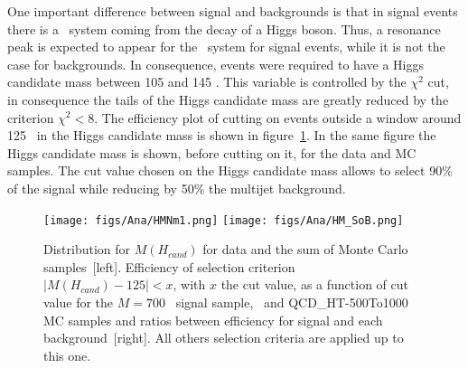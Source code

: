 %
%
One important difference between signal and backgrounds is that in signal events there is a \bbbar~system coming from the decay of a Higgs boson. Thus, a resonance peak is expected to appear for the \bbbar~system for signal events, while it is not the case for backgrounds. In consequence, events were required to have a Higgs candidate mass between 105 and 145 \GeVcc. This variable is controlled by the $\chi^{2}$ cut, in consequence the tails of the Higgs candidate mass are greatly reduced by the criterion $\chi^{2}<8$. The efficiency plot of cutting on events outside a window around 125 \GeVcc~in the Higgs candidate mass is shown in figure~\ref{fig:HiggsMassDMC}. In the same figure the Higgs candidate mass is shown, before cutting on it, for the data and MC samples. The cut value chosen on the Higgs candidate mass allows to select 90\% of the signal while reducing by 50\% the multijet background. 

\begin{figure}[!Hhtbp]
  \begin{center}
    \texttt{[image: figs/Ana/HMNm1.png]}
    \texttt{[image: figs/Ana/HM\_SoB.png]}
    \caption{Distribution for $M(H_{cand})$ for data and the sum of Monte Carlo samples~[left]. Efficiency of selection criterion $|M(H_{cand})-125|<x$, with $x$ the cut value, as a function of cut value for the $M=700$ \GeVcc~signal sample, \ttbar~and QCD\_HT-500To1000 MC samples and ratios between efficiency for signal and each background~[right]. All others selection criteria are applied up to this one.}
    \label{fig:HiggsMassDMC}
  \end{center}
\end{figure}

